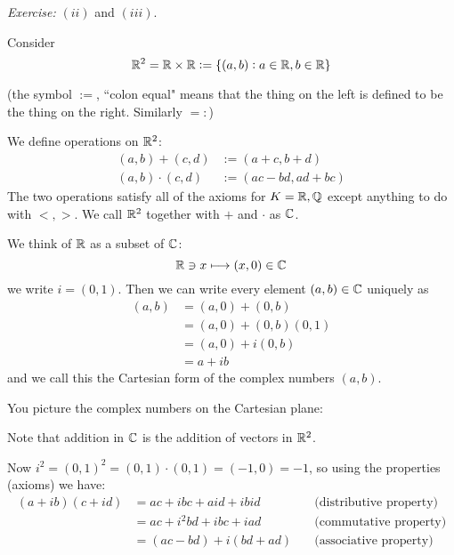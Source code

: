 \documentclass[twoside]{scrartcl}
\begin{document}
\emph{Exercise:} $(ii)$ and $(iii)$. 





Consider 
\[\mathbb{R}^2 = \mathbb{R} \times \mathbb{R}:= \{(a,b): a \in\mathbb{R}, b\in\mathbb{R}\}\]

(the symbol $:=$, ``colon equal" means that the thing on the left is defined to be the thing on the right. Similarly $=:$)\\

\begin{definition} We define operations on $\mathbb{R}^2$: 
\[
\begin{aligned}
  (a,b) + (c,d) &:= (a+c,b+d)\\
  (a,b) \cdot (c,d) &:= (ac-bd, ad+bc)
\end{aligned}
\]
The two operations satisfy all of the axioms for $K = \mathbb{R}, \mathbb{Q}$ except anything to do with $<, >$. We call $\mathbb{R}^2$ together with $+$ and $\cdot$ as $\mathbb{C}$. 
\end{definition}

We think of $\mathbb{R}$ as a subset of $\mathbb{C}$: 
\[\mathbb{R} \ni x \longmapsto (x,0) \in \mathbb{C}\]
we write $i = (0,1)$. Then we can write every element $(a,b) \in\mathbb{C}$ uniquely as
\[
\begin{aligned}
  (a,b) &= (a,0) + (0,b)\\ 
  &= (a,0) + (0,b)(0,1)\\
  &= (a,0) + i(0,b)\\
  &= a + ib
\end{aligned}
\]
and we call this the Cartesian form of the complex numbers $(a,b)$. 

You picture the complex numbers on the Cartesian plane: 

\begin{center}
\end{center}

Note that addition in $\mathbb{C}$ is the addition of vectors in $\mathbb{R}^2$. 

Now $i^2 = (0,1)^2 = (0,1)\cdot (0,1) = (-1,0) = -1$, so using the properties (axioms) we have: 
\[
\begin{aligned}
   (a+ib)(c+id) &= ac +ibc + aid + ibid &\quad\text{(distributive property)}\\
   &= ac + i^2bd + ibc + iad &\quad\text{(commutative property)}\\
   &= (ac - bd) + i(bd + ad) &\quad\text{(associative property)}
\end{aligned}
\]
\end{document}
